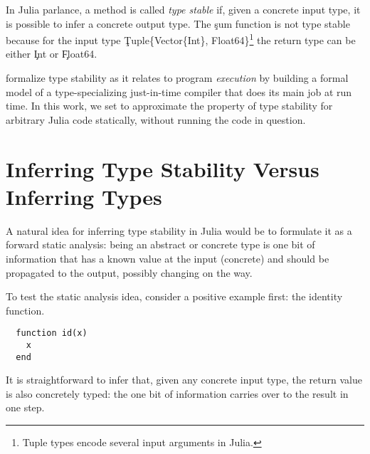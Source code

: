 \documentclass[sigplan,screen]{acmart}
\begin{document}
In Julia parlance, a method is called \emph{type stable} if, given a concrete
input type, it is possible to infer a concrete output type. The \c{sum} function
is not type stable because for the input type \c{Tuple\{Vector\{Int\},
Float64\}}\footnote{Tuple types encode several input arguments in Julia.}
the return type can be either \c{Int} or \c{Float64}.

\citet{Pelenitsyn21} formalize type stability as it
relates to program \emph{execution} by building a formal model of a
type-specializing just-in-time compiler that does its main job at run time.
In this work, we set to approximate the property of type stability for
arbitrary Julia code statically, without running the code in question.

\section{Inferring Type Stability Versus Inferring Types}%
\label{sec:arrive}

A natural idea for inferring type stability in Julia would be to formulate it as
a forward static analysis: being an abstract or concrete type is one bit of
information that has a known value at the input (concrete) and should be
propagated to the output, possibly changing on the way.

To test the static analysis idea, consider a positive example first: the
identity function.
\begin{lstlisting}
  function id(x)
    x
  end
\end{lstlisting}
%
It is straightforward to infer that, given any concrete input type, the return
value is also concretely typed: the one bit of information carries over to the
result in one step.
\end{document}
